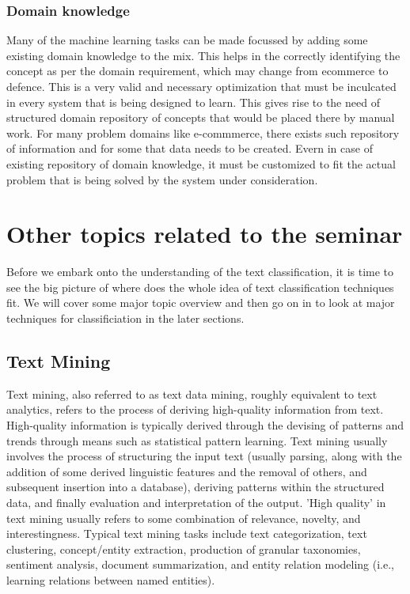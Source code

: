 \documentclass[12pt]{book}
\begin{document}
\subsection{Domain knowledge}
Many of the machine learning tasks can be made focussed by adding some existing domain knowledge to the mix. This helps in the correctly identifying the concept as per the domain requirement, which may change from ecommerce to defence. This is a very valid and necessary optimization
that must be inculcated in every system that is being designed to learn. This gives rise to the need of structured domain repository of concepts that would be placed there by manual work. For many problem domains like e-commmerce, there exists such repository of information and for some 
that data needs to be created. Evern in case of existing repository of domain knowledge, it must be customized to fit the actual problem that is being solved by the system under consideration.

\chapter{Other topics related to the seminar}

Before we embark onto the understanding of the text classification, it is time to see the big picture of where does the whole idea of text classification techniques fit. We will cover some major topic overview and then go on in to look at major techniques for classificiation in the later sections. 

\section{Text Mining}
Text mining\cite{wikipedia-textmining}, also referred to as text data mining, roughly equivalent to text analytics, refers to the process of deriving high-quality information from text. High-quality information is typically derived through the devising of patterns and trends through means such as statistical pattern learning. Text mining usually involves the process of structuring the input text (usually parsing, along with the addition of some derived linguistic features and the removal of others, and subsequent insertion into a database), deriving patterns within the structured data, and finally evaluation and interpretation of the output. 'High quality' in text mining usually refers to some combination of relevance, novelty, and interestingness. Typical text mining tasks include text categorization, text clustering, concept/entity extraction, production of granular taxonomies, sentiment analysis, document summarization, and entity relation modeling (i.e., learning relations between named entities).
\end{document}
